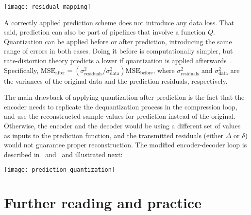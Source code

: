 \begin{center}
\texttt{[image: residual\_mapping]}
\end{center}

A correctly applied prediction scheme does not introduce any data loss. That said, prediction can also be part of  pipelines that involve a  function $Q$. Quantization can be applied before or after prediction, introducing the same range of errors in both cases. Doing it before is computationally simpler, but rate-distortion theory predicts a lower  if quantization is applied afterwards~\cite[\S 3.3]{taubman2002jpeg2000}.
%
Specifically, $\textrm{MSE}_\textrm{after} = ({\sigma_\textrm{residuals}^2}/{\sigma_\textrm{data}^2}) \textrm{MSE}_\textrm{before}$, where $\sigma_\textrm{residuals}^2$ and $\sigma_\textrm{data}^2$ are the variances of the original data and the prediction residuals, respectively.
%

The main drawback of applying quantization after prediction is the fact that the encoder needs to
replicate the dequantization process in the compression loop, and use the reconstructed sample values for prediction instead of the original. Otherwise, the encoder and the decoder would be using a different set of values as inputs to the prediction function, and the transmitted residuals (either $\Delta$ or $\delta$) would not guarantee proper reconstruction. The modified encoder-decoder loop is described in~\cite[\S 3.3]{taubman2002jpeg2000} and~\cite[\S 11.3]{sayood_introduction} and illustrated next:

\begin{center}
\texttt{[image: prediction\_quantization]}
\end{center}





\section*{Further reading and practice}

